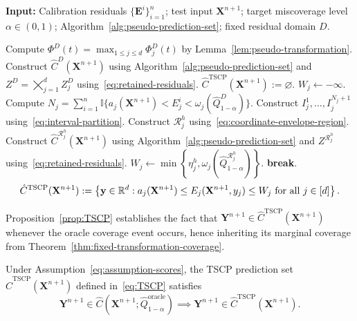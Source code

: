 \begin{algorithm}[!htbp]
\caption{Transductively Standardized Conformal Prediction (TSCP)}
\label{alg:coordinatewise-bounds}
\textbf{Input:} Calibration residuals $\{\mathbf E^i\}_{i=1}^n$; test input $\mathbf X^{n+1}$; target miscoverage level $\alpha\in(0,1)$; Algorithm~\ref{alg:pseudo-prediction-set}; fixed residual domain $D$.
\begin{algorithmic}[1]
\State Compute $\Phi^D(t) = \max_{1\leq j\leq d}\Phi^D_j(t)$ by Lemma~\ref{lem:pseudo-transformation}.
\State Construct $\hat C^D(\mathbf X^{n+1})$ using Algorithm~\ref{alg:pseudo-prediction-set} and $Z^D = \bigtimes^d_{j=1}Z^D_j$ using~\eqref{eq:retained-residuals}.
    \State \Return $\hat C^{\mathrm{TSCP}}(\mathbf X^{n+1}):=\varnothing$.
\EndIf
{}
    \State $W_j\gets-\infty$.
    \State Compute $N_j = \sum^n_{i=1}\mathbb{I}\{a_j(\mathbf X^{n+1})<E^i_j<\omega_j(\hat Q^D_{1-\alpha})\}$. 
    \State Construct $I_j^1,\ldots,I_j^{N_j+1}$ using~\eqref{eq:interval-partition}.
        \State Construct $\mathcal{R}^h_j$ using~\eqref{eq:coordinate-envelope-region}.
        \State Construct $\hat C^{\mathcal{R}^h_j}(\mathbf X^{n+1})$ using Algorithm~\ref{alg:pseudo-prediction-set} and $Z^{\mathcal{R}^h_j}$ using~\eqref{eq:retained-residuals}.
            \State
            $\displaystyle
            W_j\gets
            \min\left\{\eta_j^h,
            \omega_j(\hat Q^{\mathcal R_j^h}_{1-\alpha})\right\}$.
            \State \textbf{break}.
        \EndIf
    \EndFor
\EndFor
\State \Return 
\[
\hat C^{\mathrm{TSCP}}(\mathbf X^{n+1})
:=
\left\{\mathbf y\in\mathbb{R}^d:
a_j(\mathbf X^{n+1})
\leq E_j(\mathbf X^{n+1},y_j)\leq W_j
\text{ for all }j\in[d]\right\}.
\]
\end{algorithmic}
\end{algorithm}


Proposition~\ref{prop:TSCP} establishes the fact that $\mathbf Y^{n+1} \in \hat C^{\mathrm{TSCP}}(\mathbf X^{n+1})$ whenever the oracle coverage event occurs, hence inheriting its marginal coverage from Theorem~\ref{thm:fixed-transformation-coverage}.



\begin{proposition}\label{prop:TSCP}
Under Assumption~\ref{eq:assumption-scores}, the TSCP prediction set $\hat C^{\mathrm{TSCP}}(\mathbf X^{n+1})$ defined in~\eqref{eq:TSCP} satisfies
\[
\mathbf Y^{n+1}\in
\hat C(\mathbf X^{n+1};\hat Q^{\mathrm{oracle}}_{1-\alpha})
\implies
\mathbf Y^{n+1}\in
\hat C^{\mathrm{TSCP}}(\mathbf X^{n+1}).
\]
\end{proposition}

